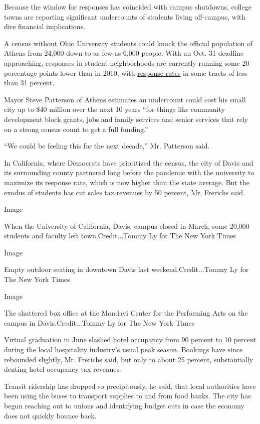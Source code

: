 Because the window for responses has coincided with campus shutdowns,
college towns are reporting significant undercounts of students living
off-campus, with dire financial implications.

A census without Ohio University students could knock the official
population of Athens from 24,000 down to as few as 6,000 people. With an
Oct. 31 deadline approaching, responses in student neighborhoods are
currently running some 20 percentage points lower than in 2010, with
\href{https://2020census.gov/en/response-rates.html}{response rates} in
some tracts of less than 31 percent.

Mayor Steve Patterson of Athens estimates an undercount could cost his
small city up to \$40 million over the next 10 years ``for things like
community development block grants, jobs and family services and senior
services that rely on a strong census count to get a full funding.''

``We could be feeling this for the next decade,'' Mr. Patterson said.

In California, where Democrats have prioritized the census, the city of
Davis and its surrounding county partnered long before the pandemic with
the university to maximize its response rate, which is now higher than
the state average. But the exodus of students has cut sales tax revenues
by 50 percent, Mr. Frerichs said.

Image

When the University of California, Davis, campus closed in March, some
20,000 students and faculty left town.Credit...Tommy Ly for The New York
Times

Image

Empty outdoor seating in downtown Davis last weekend.Credit...Tommy Ly
for The New York Times

Image

The shuttered box office at the Mondavi Center for the Performing Arts
on the campus in Davis.Credit...Tommy Ly for The New York Times

Virtual graduation in June slashed hotel occupancy from 90 percent to 10
percent during the local hospitality industry's usual peak season.
Bookings have since rebounded slightly, Mr. Frerichs said, but only to
about 25 percent, substantially denting hotel occupancy tax revenues.

Transit ridership has dropped so precipitously, he said, that local
authorities have been using the buses to transport supplies to and from
food banks. The city has begun reaching out to unions and identifying
budget cuts in case the economy does not quickly bounce back.

